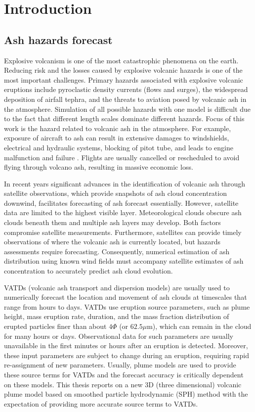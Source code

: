 \chapter{Introduction} \label{chapter:introduction}
\section{Ash hazards forecast}
Explosive volcanism is one of the most catastrophic
phenomena on the earth.
Reducing risk and the losses caused by explosive volcanic hazards is one of the most important challenges.
Primary hazards associated with explosive volcanic eruptions include pyroclastic density currents (flows and surges), the widespread deposition of airfall tephra, and the threats to aviation posed by volcanic ash in the atmosphere. Simulation of all possible hazards with one model is difficult due to the fact that different length scales dominate different hazards. Focus of this work is the hazard related to volcanic ash in the atmosphere. For example, exposure of aircraft to ash can result in extensive damages to windshields, electrical and hydraulic systems, blocking of pitot tube, and leads to engine malfunction and failure \citep{peterson2008forecasting}. Flights are usually cancelled or rescheduled to avoid flying through volcano ash, resulting in massive economic loss.

In recent years significant advances in
the identification of volcanic ash through satellite observations, which provide snapshots of ash cloud concentration downwind, facilitates forecasting of ash forecast essentially.
However, satellite data are limited to the highest visible layer. Meteorological clouds obscure ash clouds beneath them and multiple ash layers may develop. Both factors compromise satellite measurements. Furthermore, satellites can provide timely observations of where the volcanic ash is currently located, but hazards assessments
require forecasting. Consequently, numerical estimation of ash distribution using known wind fields must accompany satellite estimates of ash concentration to accurately predict ash cloud evolution.

VATDs (volcanic ash transport and dispersion models) are usually used to numerically forecast the location and movement of ash clouds at timescales that range from hours to days. VATDs use eruption source parameters, such as plume height, mass eruption rate, duration, and the mass fraction distribution of erupted particles finer than about $4 \Phi$ (or $62.5 \mu$m), which can remain in the cloud for many hours or days. Observational data for such parameters are usually unavailable in the first minutes or hours after an eruption is detected. Moreover, these input parameters are subject to change during an eruption, requiring rapid re-assignment of new parameters. Usually, plume models are used to provide these source terms for VATDs and the forecast accuracy is critically dependent on these models. This thesis reports on a new 3D (three dimensional) volcanic plume model based on smoothed particle hydrodynamic (SPH) method with the expectation of providing more accurate source terms to VATDs.

